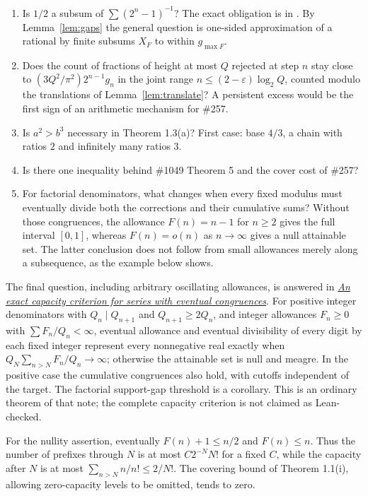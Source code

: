 \documentclass[11pt]{article}
\begin{document}
\begin{enumerate}
\item Is $1/2$ a subsum of $\sum(2^n-1)^{-1}$?  The exact obligation is in
  \cite[Theorem~7]{plectis257}.  By Lemma~\ref{lem:gaps} the general question is
  one-sided approximation of a rational by finite subsums $X_F$ to within
  $g_{\max F}$.
\item Does the count of fractions of height at most $Q$ rejected at step $n$
  stay close to $(3Q^2/\pi^2)2^{n-1}g_n$ in the joint range
  $n\le(2-\varepsilon)\log_2Q$, counted modulo the translations of
  Lemma~\ref{lem:translate}?  A persistent excess would be the first sign of an
  arithmetic mechanism for \#257.
\item Is $a^2>b^3$ necessary in Theorem 1.3(a)?  First case: base $4/3$, a chain
  with ratios $2$ and infinitely many ratios $3$.
\item Is there one inequality behind \#1049 Theorem 5 and the cover cost of
  \#257?
\item For factorial denominators, what changes when every fixed modulus must
  eventually divide both the corrections and their cumulative sums?
  Without those congruences, the allowance $F(n)=n-1$ for $n\ge2$ gives the
  full interval $[0,1]$, whereas $F(n)=o(n)$ as $n\to\infty$ gives a null
  attainable set.  The latter conclusion does not follow from small
  allowances merely along a subsequence, as the example below shows.
\end{enumerate}

The final question, including arbitrary oscillating allowances, is answered in
\href{optimal-sparse-perturbations.pdf}{\emph{An exact capacity criterion for
series with eventual congruences}}. For positive integer denominators with
$Q_n\mid Q_{n+1}$ and $Q_{n+1}\ge2Q_n$, and integer allowances $F_n\ge0$
with $\sum F_n/Q_n<\infty$, eventual allowance and eventual divisibility of
every digit by each fixed integer represent every nonnegative real exactly
when $Q_N\sum_{n>N}F_n/Q_n\to\infty$; otherwise the attainable set is null
and meagre. In the positive case the cumulative congruences also hold, with
cutoffs independent of the target. The factorial support-gap threshold is a
corollary. This is an ordinary theorem of that note; the complete capacity
criterion is not claimed as Lean-checked.

For the nullity assertion, eventually $F(n)+1\le n/2$ and $F(n)\le n$.
Thus the number of prefixes through $N$ is at most $C2^{-N}N!$ for a fixed
$C$, while the capacity after $N$ is at most
$\sum_{n>N}n/n!\le2/N!$.  The covering bound of Theorem 1.1(i), allowing
zero-capacity levels to be omitted, tends to zero.
\end{document}
